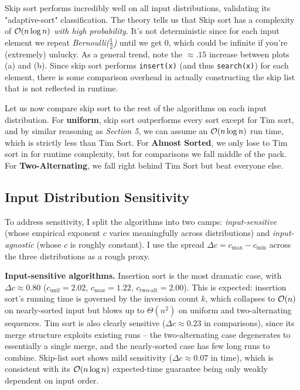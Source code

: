 Skip sort performs incredibly well on all input distributions, validating its "adaptive-sort" classification. The theory tells us that Skip sort has a complexity of $\mathcal{O}(n \log n)$ \emph{with high probability}. It's not deterministic since for each input element we repeat \emph{Bernoulli($\frac{1}{2}$)} until we get $0$, which could be infinite if you're (extremely) unlucky. As a general trend, note the $\approx .15$ increase between plots (a) and (b). Since skip sort performs \texttt{insert(x)} (and thus \texttt{search(x)}) for each element, there is some comparison overhead in actually constructing the skip list that is not reflected in runtime.

Let us now compare skip sort to the rest of the algorithms on each input distribution. For \textbf{uniform}, skip sort outperforms every sort except for Tim sort, and by similar reasoning as \emph{Section 5}, we can assume an $\mathcal{O}(n \log n)$ run time, which is strictly less than Tim Sort. For \textbf{Almost Sorted}, we only lose to Tim sort in for runtime complexity, but for comparisons we fall middle of the pack. For \textbf{Two-Alternating}, we fall right behind Tim Sort but beat everyone else.

\subsection{Input Distribution Sensitivity}
To address sensitivity, I split the algorithms into two camps: \emph{input-sensitive} (whose empirical exponent $c$ varies meaningfully across distributions) and \emph{input-agnostic} (whose $c$ is roughly constant). I use the spread $\Delta c = c_{\max} - c_{\min}$ across the three distributions as a rough proxy.

\textbf{Input-sensitive algorithms.} Insertion sort is the most dramatic case, with $\Delta c \approx 0.80$ ($c_{\text{unif}} = 2.02$, $c_{\text{near}} = 1.22$, $c_{\text{two-alt}} = 2.00$). This is expected: insertion sort's running time is governed by the inversion count $k$, which collapses to $\mathcal{O}(n)$ on nearly-sorted input but blows up to $\Theta(n^2)$ on uniform and two-alternating sequences. Tim sort is also clearly sensitive ($\Delta c \approx 0.23$ in comparisons), since its merge structure exploits existing runs -- the two-alternating case degenerates to essentially a single merge, and the nearly-sorted case has few long runs to combine. Skip-list sort shows mild sensitivity ($\Delta c \approx 0.07$ in time), which is consistent with its $\mathcal{O}(n \log n)$ expected-time guarantee being only weakly dependent on input order.

